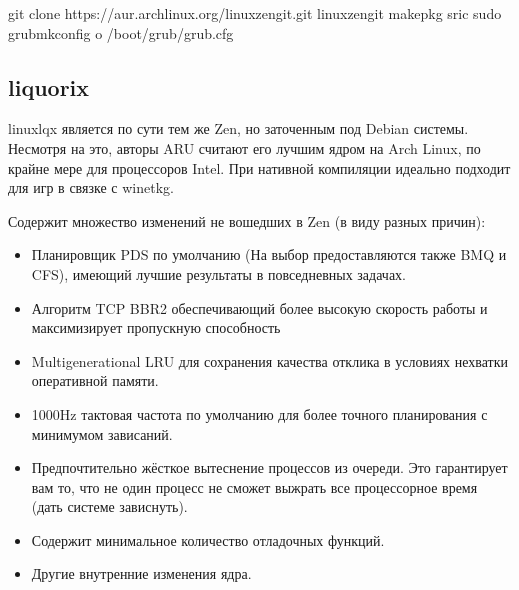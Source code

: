 \documentclass[letterpaper,10pt,russian,openany]{sphinxmanual}
\begin{document}
\sphinxAtStartPar
{}

\begin{sphinxVerbatim}[commandchars=\\\{\}]
git clone https://aur.archlinux.org/linux\PYGZhy{}zen\PYGZhy{}git.git
 linux\PYGZhy{}zen\PYGZhy{}git
makepkg \PYGZhy{}sric
sudo grub\PYGZhy{}mkconfig \PYGZhy{}o /boot/grub/grub.cfg
\end{sphinxVerbatim}

\ignorespaces 

\subsection{liquorix}
\label{\detokenize{source/custom-kernels:liquorix}}\label{\detokenize{source/custom-kernels:linux-lqx}}\label{\detokenize{source/custom-kernels:index-2}}
\sphinxAtStartPar
linux\sphinxhyphen{}lqx \sphinxhyphen{} является по сути тем же Zen, но заточенным под Debian системы.
Несмотря на это, авторы ARU считают его лучшим ядром на Arch Linux, по крайне мере для процессоров Intel.
При нативной компиляции идеально подходит для игр в связке с wine\sphinxhyphen{}tkg.

\sphinxAtStartPar
Содержит множество изменений не вошедших в Zen (в виду разных причин):
\begin{itemize}
\item {} 
\sphinxAtStartPar
Планировщик PDS по умолчанию (На выбор предоставляются также BMQ и CFS), имеющий лучшие результаты в повседневных задачах.

\item {} 
\sphinxAtStartPar
Алгоритм TCP BBR2 обеспечивающий более высокую скорость работы и максимизирует пропускную способность

\item {} 
\sphinxAtStartPar
Multigenerational LRU для сохранения качества отклика в условиях нехватки оперативной памяти.

\item {} 
\sphinxAtStartPar
1000Hz тактовая частота по умолчанию для более точного планирования с минимумом зависаний.

\item {} 
\sphinxAtStartPar
Предпочтительно жёсткое вытеснение процессов из очереди. Это гарантирует вам то, что не один процесс не сможет
выжрать все процессорное время (дать системе зависнуть).

\item {} 
\sphinxAtStartPar
Содержит минимальное количество отладочных функций.

\item {} 
\sphinxAtStartPar
Другие внутренние изменения ядра.

\end{itemize}
\end{document}
